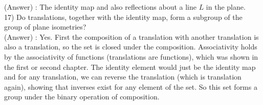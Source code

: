 \documentclass[12pt, letterpaper]{article}
\begin{document}
(Answer) : The identity map and also reflections about a line $L$ in the plane. \\

17) Do translations, together with the identity map, form a subgroup of the group of plane isometries? \\

(Answer) : Yes. First the composition of a translation with another translation is also a translation, so the set is closed under the composition. Associativity holds by the associativity of functions (translations are functions), which was shown in the first or second chapter. The identity element would just be the identity map and for any translation, we can reverse the translation (which is translation again), showing that inverses exist for any element of the set. So this set forms a group under the binary operation of composition.\\
\end{document}
